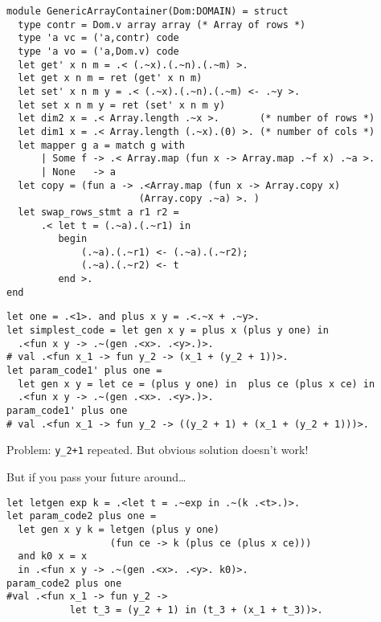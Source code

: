\documentclass[landscape]{slides}
\begin{document}
\begin{slide}
\begin{verbatim}
module GenericArrayContainer(Dom:DOMAIN) = struct
  type contr = Dom.v array array (* Array of rows *)
  type 'a vc = ('a,contr) code
  type 'a vo = ('a,Dom.v) code
  let get' x n m = .< (.~x).(.~n).(.~m) >.
  let get x n m = ret (get' x n m)
  let set' x n m y = .< (.~x).(.~n).(.~m) <- .~y >.
  let set x n m y = ret (set' x n m y)
  let dim2 x = .< Array.length .~x >.       (* number of rows *)
  let dim1 x = .< Array.length (.~x).(0) >. (* number of cols *)
  let mapper g a = match g with
      | Some f -> .< Array.map (fun x -> Array.map .~f x) .~a >.
      | None   -> a
  let copy = (fun a -> .<Array.map (fun x -> Array.copy x) 
                       (Array.copy .~a) >. )
  let swap_rows_stmt a r1 r2 =
      .< let t = (.~a).(.~r1) in
         begin 
             (.~a).(.~r1) <- (.~a).(.~r2);
             (.~a).(.~r2) <- t
         end >.
end
\end{verbatim}
\end{slide}

\begin{slide}
\begin{verbatim}
let one = .<1>. and plus x y = .<.~x + .~y>.
let simplest_code = let gen x y = plus x (plus y one) in
  .<fun x y -> .~(gen .<x>. .<y>.)>.
# val .<fun x_1 -> fun y_2 -> (x_1 + (y_2 + 1))>.
let param_code1' plus one =
  let gen x y = let ce = (plus y one) in  plus ce (plus x ce) in
  .<fun x y -> .~(gen .<x>. .<y>.)>.
param_code1' plus one
# val .<fun x_1 -> fun y_2 -> ((y_2 + 1) + (x_1 + (y_2 + 1)))>.
\end{verbatim}
Problem: \verb=y_2+1= repeated.  But obvious solution doesn't work!
\end{slide}

\begin{slide}
    But if you pass your future around\dots
\begin{verbatim}
let letgen exp k = .<let t = .~exp in .~(k .<t>.)>.
let param_code2 plus one =
  let gen x y k = letgen (plus y one) 
                  (fun ce -> k (plus ce (plus x ce)))
  and k0 x = x
  in .<fun x y -> .~(gen .<x>. .<y>. k0)>.
param_code2 plus one
#val .<fun x_1 -> fun y_2 -> 
           let t_3 = (y_2 + 1) in (t_3 + (x_1 + t_3))>.
\end{verbatim}
\end{slide}
\end{document}
